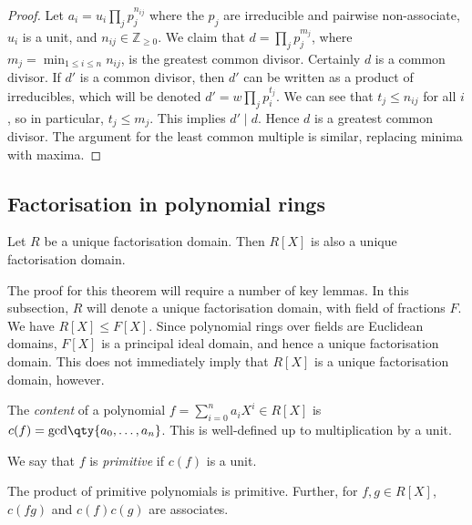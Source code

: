 \begin{proof}
	Let $a_i = u_i \prod_j p_j^{n_{ij}}$ where the $p_j$ are irreducible and pairwise non-associate, $u_i$ is a unit, and $n_{ij} \in \mathbb Z_{\geq 0}$.
	We claim that $d = \prod_j p_j^{m_j}$, where $m_j = \min_{1 \leq i \leq n} n_{ij}$, is the greatest common divisor.
	Certainly $d$ is a common divisor.
	If $d'$ is a common divisor, then $d'$ can be written as a product of irreducibles, which will be denoted $d' = w \prod_j p_i^{t_j}$.
	We can see that $t_j \leq n_{ij}$ for all $i$, so in particular, $t_j \leq m_j$.
	This implies $d' \mid d$.
	Hence $d$ is a greatest common divisor.
	The argument for the least common multiple is similar, replacing minima with maxima.
\end{proof}

\subsection{Factorisation in polynomial rings}
\begin{theorem}
	Let $R$ be a unique factorisation domain.
	Then $R[X]$ is also a unique factorisation domain.
\end{theorem}
The proof for this theorem will require a number of key lemmas.
In this subsection, $R$ will denote a unique factorisation domain, with field of fractions $F$.
We have $R[X] \leq F[X]$.
Since polynomial rings over fields are Euclidean domains, $F[X]$ is a principal ideal domain, and hence a unique factorisation domain.
This does not immediately imply that $R[X]$ is a unique factorisation domain, however.
\begin{definition}
	The \textit{content} of a polynomial $f = \sum_{i=0}^n a_i X^i \in R[X]$ is $c(f) = \mathrm{gcd}\qty{a_0, \dots, a_n}$.
	This is well-defined up to multiplication by a unit.

	We say that $f$ is \textit{primitive} if $c(f)$ is a unit.
\end{definition}
\begin{lemma}
	The product of primitive polynomials is primitive.
	Further, for $f, g \in R[X]$, $c(fg)$ and $c(f)c(g)$ are associates.
\end{lemma}
